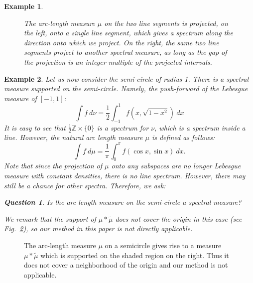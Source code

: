 \documentclass[12pt,a4paper,oneside]{amsart}
\newtheorem{example}{Example}
\newtheorem{question}{Question}
\theoremstyle{definition}
\newcommand{\ZZ}{{\mathbb Z}}
\newcommand{\wt}[1]{\widetilde{#1}}
\newcounter{rem}
\begin{document}
\begin{example}
\begin{figure}[h]
\ifdefined\SMART\resizebox{4cm}{!}{}\else

\fi
\caption{The arc-length measure $\mu$ on the two line segments is projected, on the left, onto a single line segment, which gives a spectrum along the direction onto which we project. On the right, the same two line segments project to another spectral measure, as long as the gap of the projection is an integer multiple of the projected intervals.}\label{fig:line-spectra}
\end{figure}
\end{example}

\begin{example}
 {\rm Let us now consider the semi-circle of radius 1.  There is a spectral measure supported on the semi-circle. Namely, the push-forward of the Lebesgue measure of $[-1,1]$:
$$
\int f~d\nu = \frac12\int_{-1}^{1} f(x,\sqrt{1-x^2})~dx
$$
It is easy to see that $\frac12\ZZ\times \{0\}$ is a spectrum for $\nu$, which is a spectrum inside a line. However, the natural arc length measure $\mu$ is defined as follows:
$$
\int f~d\mu = \frac1{\pi}\int_{0}^{\pi} f(\cos x,\sin x)~dx.
$$
Note that since the projection of $\mu$ onto any subspaces are no longer Lebesgue measure with constant densities, there is no line spectrum. However, there may still be a chance for other spectra. Therefore, we ask:
\begin{question}\label{question2}
Is the arc length measure on the semi-circle a spectral measure?
\end{question}
We remark that the  support of $\mu\ast\wt\mu$ does not cover the origin in this case (see Fig.\ \ref{fig:semicircle}), so our method in this paper is not directly applicable. }
\end{example}


\begin{figure}[h]
\ifdefined\SMART\resizebox{4cm}{!}{}\else

\fi
\caption{The arc-length measure $\mu$ on a semicircle gives rise to a measure $\mu*\wt\mu$ which is supported on the shaded region on the right. Thus it does not cover a neighborhood of the origin and our method is not applicable.}\label{fig:semicircle}
\end{figure}
\end{document}
